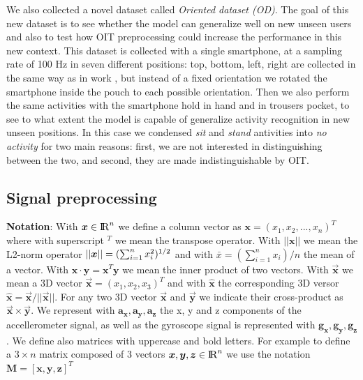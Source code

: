 We also collected a novel dataset called \textit{Oriented dataset
  (OD)}. The goal of this new dataset is to see whether the model can
generalize well on new unseen users and also to test how OIT
preprocessing could increase the performance in this new context. This
dataset is collected with a single smartphone, at a sampling rate of
100 Hz in seven different positions: top, bottom, left, right are
collected in the same way as in work \cite{stisen2015smart}, but
instead of a fixed orientation we rotated the smartphone inside the
pouch to each possible orientation. Then we also perform the same
activities with the smartphone hold in hand and in trousers pocket, to
see to what extent the model is capable of generalize activity
recognition in new unseen positions. In this case we condensed
\textit{sit} and \textit{stand} antivities into \textit{no activity}
for two main reasons: first, we are not interested in distinguishing
between the two, and second, they are made indistinguishable by OIT.

\subsection{Signal preprocessing}

\textbf{Notation}: With $\boldsymbol{x} \in {\rm I\!R}^{n}$ we define a column vector as $\boldsymbol{x}=(x_{1}, x_{2}, ..., x_{n})^{T}$ where with superscript $^T$ we mean the transpose operator. With $\boldsymbol{||x||}$ we mean the L2-norm operator $||\boldsymbol{x}|| = (\sum_{i=1}^{n} x_{i}^{2})^{1/2}$ and with $\bar{x} = (\sum_{i=1}^{n} x_{i}) / n$ the mean of a vector. With $\boldsymbol{x} \cdot \boldsymbol{y} =\boldsymbol{x}^{T}\boldsymbol{y} $ we mean the inner product of two vectors. With $\boldsymbol{\vec{x}}$ we mean a 3D vector $\boldsymbol{\vec{x}} = (x_{1}, x_{2}, x_{3})^{T}$ and with $\boldsymbol{\hat{x}}$ the corresponding 3D versor $\boldsymbol{\hat{x}}=\boldsymbol{\vec{x}}/ ||\boldsymbol{\vec{x}}||$. For any two 3D vector $\boldsymbol{\vec{x}}$ and $\boldsymbol{\vec{y}}$ we indicate their cross-product as $\boldsymbol{\vec{x}} \times \boldsymbol{\vec{y}}$. We represent with $\boldsymbol{a_{x}}, \boldsymbol{a_{y}}, \boldsymbol{a_{z}}$ the x, y and z components of the accellerometer signal, as well as the gyroscope signal is represented with $\boldsymbol{g_{x}}, \boldsymbol{g_{y}}, \boldsymbol{g_{z}}$. We define also matrices with uppercase and bold letters. For example to define a $3 \times n$ matrix composed of 3 vectors \mbox{$\boldsymbol{x}, \boldsymbol{y}, \boldsymbol{z} \in {\rm I\!R}^{n}$} we use the notation \mbox{$\boldsymbol{M} = [\boldsymbol{x}, \boldsymbol{y}, \boldsymbol{z}]^{T}$}\\

